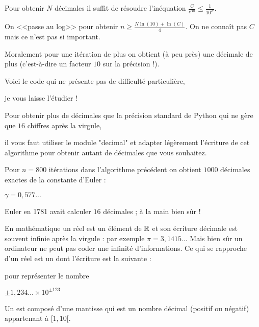 \diapo

Pour obtenir $N$ décimales il suffit de résoudre l'inéquation $\frac{C}{e^{4n}} \le \frac{1}{10^{N}}$.

\change


On <<passe au log>> pour obtenir $n \ge \frac{N \ln(10)+\ln(C)}{4}$. On ne connaît pas $C$ mais 
ce n'est pas si important.

\change

Moralement pour une itération de plus on obtient (à peu près) une décimale 
de plus (c'est-à-dire un facteur $10$ sur la précision !).


\change

Voici le code qui ne présente pas de difficulté particulière,

je vous laisse l'étudier !


Pour obtenir plus de décimales que la précision standard de Python qui ne gère que $16$ chiffres après la virgule,

il vous faut utiliser le module "decimal" et adapter légèrement l'écriture de 
cet algorithme pour obtenir autant de décimales que vous souhaitez.



\diapo

Pour $n=800$ itérations dans l'algorithme précédent on obtient $1000$ décimales exactes de la 
constante d'Euler :

$\gamma = 0,577... $

Euler en 1781 avait calculer $16$ décimales ; à la main bien sûr !


  
\diapo

En mathématique un réel est un élément de $\mathbb{R}$ et son écriture décimale est souvent infinie après la virgule :
par exemple $\pi = 3,1415\ldots$
Mais bien sûr un ordinateur ne peut pas coder une infinité d'informations. Ce qui se rapproche d'un réel est 
un  dont l'écriture est la suivante :

\change

pour représenter le nombre 

$\pm 1,234\ldots \times 10^{\pm 123}$

\change

Un  est
composé d'une mantisse qui est un nombre décimal (positif ou négatif) appartenant à $[1,10[$.

